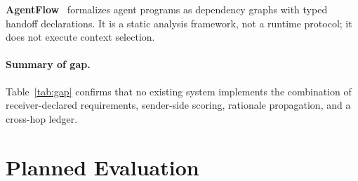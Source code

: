 \documentclass[11pt]{article}
\begin{document}
\textbf{AgentFlow}~\cite{agentflow2026} formalizes agent programs as
dependency graphs with typed handoff declarations. It is a static analysis
framework, not a runtime protocol; it does not execute context selection.

\paragraph{Summary of gap.} Table~\ref{tab:gap} confirms that no existing
system implements the combination of receiver-declared requirements,
sender-side scoring, rationale propagation, and a cross-hop ledger.

\begin{table}[h]
\centering
\caption{Comparison of context handoff mechanisms across systems.}
\label{tab:gap}
\end{table}

\section{Planned Evaluation}
\label{sec:eval}
\end{document}
